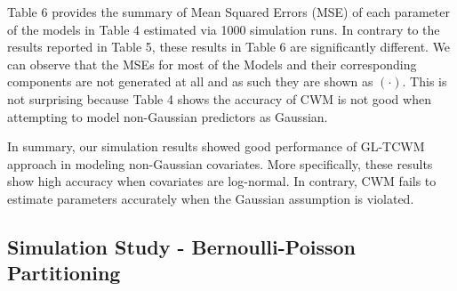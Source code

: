 \documentclass[11pt,letterpaper]{article}
\numberwithin{equation}{section}
\numberwithin{equation}{section}
\numberwithin{equation}{section}
\begin{document}
Table 6 provides the summary of Mean Squared Errors (MSE) of each parameter of the models in Table 4 estimated via 1000 simulation runs.
In contrary to the results reported in Table 5, these results in Table 6 are significantly different. We can observe that the MSEs for most of the Models and their corresponding components are not generated at all and as such they are shown as $(\cdot)$. This is not surprising because Table 4 shows the accuracy of CWM is not good when attempting to model non-Gaussian predictors as Gaussian.

In summary, our simulation results showed good performance of  GL-TCWM approach in modeling non-Gaussian covariates. More specifically, these results show high accuracy when covariates are log-normal. In contrary, CWM fails to estimate parameters accurately when the Gaussian assumption is violated.

\subsection{Simulation Study - Bernoulli-Poisson Partitioning}
\end{document}
